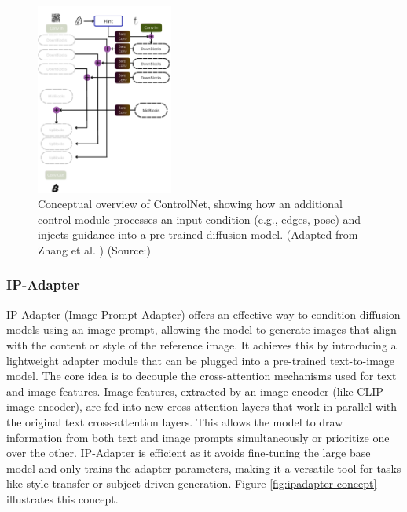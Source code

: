 \begin{figure}[ht]
  \centering
  \includegraphics[width=0.4\textwidth]{images/related-work/controlnet.png}
  \caption{Conceptual overview of ControlNet, showing how an additional control module processes an input condition (e.g., edges, pose) and injects guidance into a pre-trained diffusion model. (Adapted from Zhang et al. \cite{controlnet}) (Source:\cite{controlnet_figure})}
  \label{fig:controlnet-overview}
\end{figure}

\subsubsection{IP-Adapter}
IP-Adapter (Image Prompt Adapter) \cite{ipadapter} offers an effective way to condition diffusion models using an image prompt, allowing the model to generate images that align with the content or style of the reference image. It achieves this by introducing a lightweight adapter module that can be plugged into a pre-trained text-to-image model. The core idea is to decouple the cross-attention mechanisms used for text and image features. Image features, extracted by an image encoder (like CLIP \cite{clip} image encoder), are fed into new cross-attention layers that work in parallel with the original text cross-attention layers. This allows the model to draw information from both text and image prompts simultaneously or prioritize one over the other. IP-Adapter is efficient as it avoids fine-tuning the large base model and only trains the adapter parameters, making it a versatile tool for tasks like style transfer or subject-driven generation. Figure \ref{fig:ipadapter-concept} illustrates this concept.

